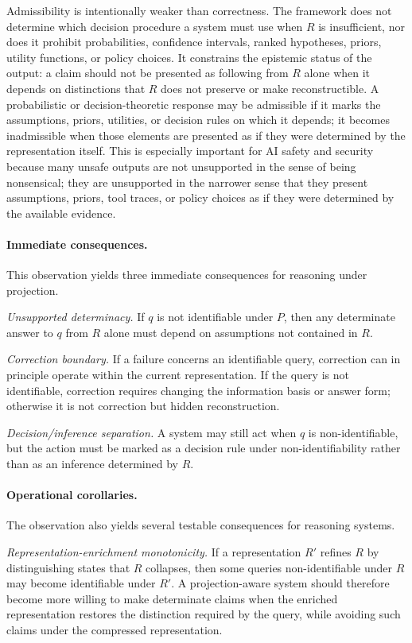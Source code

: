 \documentclass[11pt]{article}
\begin{document}
Admissibility is intentionally weaker than correctness. The framework does not determine which decision procedure a system must use when $R$ is insufficient, nor does it prohibit probabilities, confidence intervals, ranked hypotheses, priors, utility functions, or policy choices. It constrains the epistemic status of the output: a claim should not be presented as following from $R$ alone when it depends on distinctions that $R$ does not preserve or make reconstructible. A probabilistic or decision-theoretic response may be admissible if it marks the assumptions, priors, utilities, or decision rules on which it depends; it becomes inadmissible when those elements are presented as if they were determined by the representation itself. This is especially important for AI safety and security because many unsafe outputs are not unsupported in the sense of being nonsensical; they are unsupported in the narrower sense that they present assumptions, priors, tool traces, or policy choices as if they were determined by the available evidence.

\paragraph{Immediate consequences.}
This observation yields three immediate consequences for reasoning under projection.

\emph{Unsupported determinacy.}
If $q$ is not identifiable under $P$, then any determinate answer to $q$ from $R$ alone must depend on assumptions not contained in $R$.

\emph{Correction boundary.}
If a failure concerns an identifiable query, correction can in principle operate within the current representation. If the query is not identifiable, correction requires changing the information basis or answer form; otherwise it is not correction but hidden reconstruction.

\emph{Decision/inference separation.}
A system may still act when $q$ is non-identifiable, but the action must be marked as a decision rule under non-identifiability rather than as an inference determined by $R$.

\paragraph{Operational corollaries.}
The observation also yields several testable consequences for reasoning systems.

\emph{Representation-enrichment monotonicity.}
If a representation $R'$ refines $R$ by distinguishing states that $R$ collapses, then some queries non-identifiable under $R$ may become identifiable under $R'$. A projection-aware system should therefore become more willing to make determinate claims when the enriched representation restores the distinction required by the query, while avoiding such claims under the compressed representation.
\end{document}

